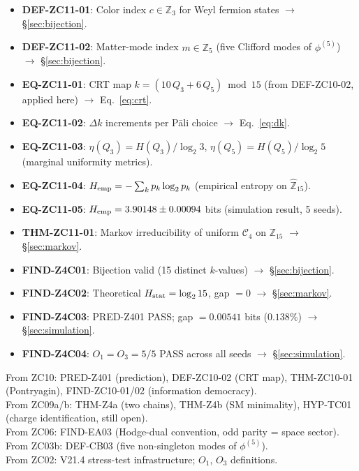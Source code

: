 \documentclass[12pt, a4paper]{article}
\begin{document}
\begin{formalbox}[title={Atomic units introduced by TASK-ZC11}]
\begin{itemize}[leftmargin=*]
  \item \textbf{DEF-ZC11-01}: Color index $c \in \mathbb{Z}_3$ for
    Weyl fermion states $\to$ \S\ref{sec:bijection}.
  \item \textbf{DEF-ZC11-02}: Matter-mode index $m \in \mathbb{Z}_5$
    (five Clifford modes of $\phi^{(5)}$) $\to$ \S\ref{sec:bijection}.
  \item \textbf{EQ-ZC11-01}: CRT map $k = (10\,Q_3+6\,Q_5)\bmod 15$
    (from DEF-ZC10-02, applied here) $\to$ Eq.~\eqref{eq:crt}.
  \item \textbf{EQ-ZC11-02}: $\Delta k$ increments per Pāli choice
    $\to$ Eq.~\eqref{eq:dk}.
  \item \textbf{EQ-ZC11-03}: $\eta(Q_3) = H(Q_3)/\log_2 3$,
    $\eta(Q_5) = H(Q_5)/\log_2 5$ (marginal uniformity metrics).
  \item \textbf{EQ-ZC11-04}: $H_{\rm emp} = -\sum_k p_k \log_2 p_k$
    (empirical entropy on $\hat{\mathbb{Z}}_{15}$).
  \item \textbf{EQ-ZC11-05}: $H_{\rm emp} = 3.90148 \pm 0.00094$ bits
    (simulation result, 5 seeds).
  \item \textbf{THM-ZC11-01}: Markov irreducibility of uniform $\mathcal{C}_4$
    on $\mathbb{Z}_{15}$ $\to$ \S\ref{sec:markov}.
  \item \textbf{FIND-Z4C01}: Bijection valid (15 distinct $k$-values)
    $\to$ \S\ref{sec:bijection}.
  \item \textbf{FIND-Z4C02}: Theoretical $H_{\rm stat} = \log_2 15$,
    gap $= 0$ $\to$ \S\ref{sec:markov}.
  \item \textbf{FIND-Z4C03}: PRED-Z401 PASS; gap $= 0.00541$ bits
    ($0.138\%$) $\to$ \S\ref{sec:simulation}.
  \item \textbf{FIND-Z4C04}: $O_1 = O_3 = 5/5$ PASS across all seeds
    $\to$ \S\ref{sec:simulation}.
\end{itemize}
\end{formalbox}

\begin{formalbox}[title={Atomic units inherited (not modified)}]
From ZC10: PRED-Z401 (prediction), DEF-ZC10-02 (CRT map),
THM-ZC10-01 (Pontryagin), FIND-ZC10-01/02 (information democracy). \\
From ZC09a/b: THM-Z4a (two chains), THM-Z4b (SM minimality),
HYP-TC01 (charge identification, still open). \\
From ZC06: FIND-EA03 (Hodge-dual convention, odd parity = space sector). \\
From ZC03b: DEF-CB03 (five non-singleton modes of $\phi^{(5)}$). \\
From ZC02: V21.4 stress-test infrastructure; $O_1$, $O_3$ definitions.
\end{formalbox}
\end{document}
